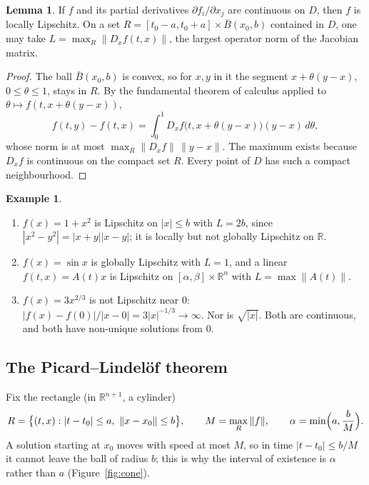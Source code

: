 \documentclass[11pt,a4paper]{article}
\numberwithin{equation}{section}
\theoremstyle{definition}
\newtheorem{exa}[thm]{Example}
\newtheorem{lem}[thm]{Lemma}
\begin{document}
\begin{lem}
\label{lem:c1lip}
If $f$ and its partial derivatives $\partial f_i/\partial x_j$ are continuous on $D$, then $f$ is locally Lipschitz. On a set $R = [t_0 - a, t_0 + a] \times \bar B(x_0, b)$ contained in $D$, one may
take $L = \max_R\|D_xf(t, x)\|$, the largest operator norm of the Jacobian matrix.
\end{lem}

\begin{proof}
The ball $\bar B(x_0, b)$ is convex, so for $x, y$ in it the segment $x + \theta(y - x)$, $0 \leq \theta \leq 1$, stays in $R$. By the fundamental theorem of calculus applied to $\theta \mapsto f(t, x + \theta(y - x))$,
\[
f(t, y) - f(t, x) = \int_0^1D_xf\bigl(t, x + \theta(y - x)\bigr)(y - x)\,d\theta ,
\]
whose norm is at most $\max_R\|D_xf\|\,\|y - x\|$. The maximum exists because $D_xf$ is continuous on the compact set $R$. Every point of $D$ has such a compact neighbourhood.
\end{proof}

\begin{exa}
\label{ex:lipschitz}
\begin{enumerate}[label=(\alph*)]
\item $f(x) = 1 + x^2$ is Lipschitz on $|x| \leq b$ with $L = 2b$, since $|x^2 - y^2| = |x + y||x - y|$; it is locally but not globally Lipschitz on $\mathbb R$.
\item $f(x) = \sin x$ is globally Lipschitz with $L = 1$, and a linear $f(t, x) = A(t)x$ is Lipschitz on $[\alpha, \beta] \times \mathbb R^n$ with $L = \max\|A(t)\|$.
\item $f(x) = 3x^{2/3}$ is not Lipschitz near $0$: $|f(x) - f(0)|/|x - 0| = 3|x|^{-1/3} \to \infty$. Nor is $\sqrt{|x|}$. Both are continuous, and both have non-unique solutions from $0$.
\end{enumerate}
\end{exa}

\subsection{The Picard--Lindel\"of theorem}
\label{ssec:picard}

Fix the rectangle (in $\mathbb R^{n+1}$, a cylinder)
\[
R = \bigl\{(t, x) : |t - t_0| \leq a,\ \|x - x_0\| \leq b\bigr\}, \qquad M = \max_R\|f\|, \qquad \alpha = \min\Bigl(a, \frac bM\Bigr).
\]
A solution starting at $x_0$ moves with speed at most $M$, so in time $|t - t_0| \leq b/M$ it cannot leave the ball of radius $b$; this is why the interval of existence is
$\alpha$ rather than $a$ (Figure~\ref{fig:cone}).
\end{document}
